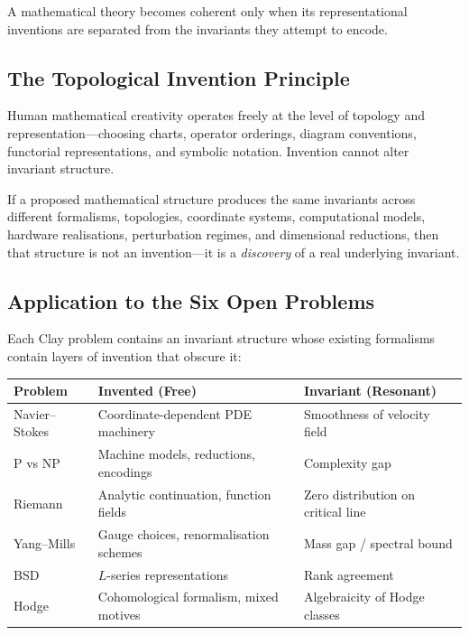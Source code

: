 \documentclass[11pt]{article}
\begin{document}
\begin{principle}\label{princ:inv-dist}
A mathematical theory becomes coherent only when its representational inventions are
separated from the invariants they attempt to encode.
\end{principle}

\subsection{The Topological Invention Principle}

\begin{axiom}\label{ax:top-inv}
Human mathematical creativity operates freely at the level of topology and
representation---choosing charts, operator orderings, diagram conventions, functorial
representations, and symbolic notation. Invention cannot alter invariant structure.
\end{axiom}

\begin{axiom}\label{ax:inv-rigid}
If a proposed mathematical structure produces the same invariants across different
formalisms, topologies, coordinate systems, computational models, hardware realisations,
perturbation regimes, and dimensional reductions, then that structure is not an
invention---it is a \emph{discovery} of a real underlying invariant.
\end{axiom}

\subsection{Application to the Six Open Problems}
\label{sec:found-clay}

Each Clay problem contains an invariant structure whose existing formalisms contain
layers of invention that obscure it:

\begin{center}
\begin{tabular}{@{}lll@{}}
\toprule
\textbf{Problem} & \textbf{Invented (Free)} & \textbf{Invariant (Resonant)} \\
\midrule
Navier--Stokes & Coordinate-dependent PDE machinery & Smoothness of velocity field \\
P vs NP        & Machine models, reductions, encodings & Complexity gap \\
Riemann        & Analytic continuation, function fields & Zero distribution on critical line \\
Yang--Mills    & Gauge choices, renormalisation schemes & Mass gap / spectral bound \\
BSD            & $L$-series representations & Rank agreement \\
Hodge          & Cohomological formalism, mixed motives & Algebraicity of Hodge classes \\
\bottomrule
\end{tabular}
\end{center}
\end{document}
